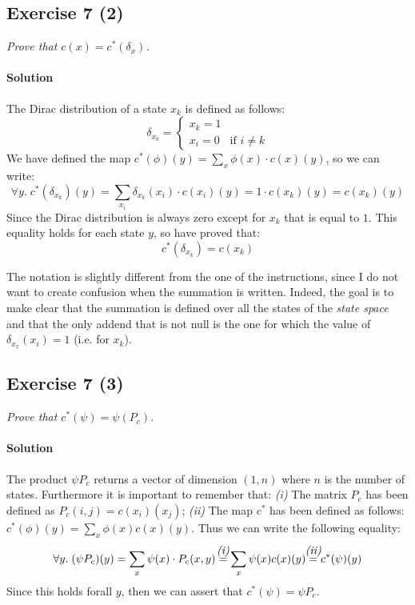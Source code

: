 \subsection*{Exercise 7 (2)}
\textit{Prove that $ c(x) = c^{*}(\delta_{x}) $.}

\paragraph{Solution}
The Dirac distribution of a state $x_{k}$ is defined as follows:
\[ \delta_{x_{k}} = 
    \begin{cases}
        x_{k} = 1 \\
        x_{i} = 0 & \text{if } i \neq k
    \end{cases}
\]
We have defined the map $c^{*}(\phi)(y) = \sum_{x} \phi(x) \cdot c(x)(y)$, so we can write:
\[ \forall y.\;c^{*}(\delta_{x_{k}})(y) = \sum_{x_{i}} \delta_{x_{k}}(x_{i}) \cdot c(x_{i})(y) = 1 \cdot c(x_{k})(y) = c(x_{k})(y) \]
Since the Dirac distribution is always zero except for $x_{k}$ that is equal to $1$.
This equality holds for each state $y$, so have proved that:
\[ c^{*}(\delta_{x_{k}}) = c(x_{k}) \]

The notation is slightly different from the one of the instructions, since I do not want to create confusion when the summation is
written. Indeed, the goal is to make clear that the summation is defined over all the states of the \textit{state space} and that
the only addend that is not null is the one for which the value of $\delta_{x_{x}}(x_{i}) = 1$ (i.e. for $x_{k}$).


\subsection*{Exercise 7 (3)}
\textit{Prove that $ c^{*}(\psi) = \psi(P_{c}) $.}

\paragraph{Solution}
The product $\psi P_{c}$ returns a vector of dimension $(1, n)$ where $n$ is the number of states. 
Furthermore it is important to remember that: \textit{(i)} The matrix $ P_{c} $ has been defined as $ P_{c}(i, j) = c(x_{i})(x_{j}) $;
\textit{(ii)} The map $c^{*}$ has been defined as follows: $ c^{*}(\phi)(y) = \sum_{x} \phi(x) c(x)(y) $.
Thus we can write the following equality:
\[ \forall y.\;(\psi P_{c})(y) = \sum_{x} \psi(x) \cdot P_{c}(x, y) \forone \sum_{x} \psi(x) c(x)(y) \fortwo c^{*}(\psi)(y) \]
Since this holds forall $y$, then we can assert that $c^{*}(\psi) = \psi P_{c}$.


